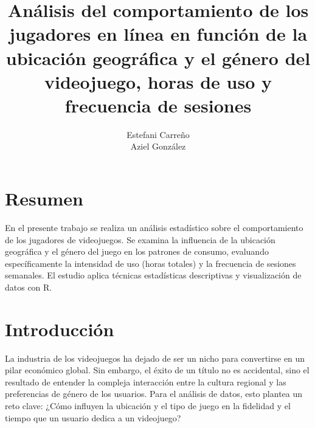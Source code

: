 \documentclass[oneside,11pt]{Latex/Classes/PhDthesisPSnPDF}
\title{Análisis del comportamiento de los jugadores en línea en función
de la ubicación geográfica y el género del videojuego, horas de uso y
frecuencia de sesiones}
\author{Estefani Carreño \\ Aziel González}
\begin{document}
\maketitle

\frontmatter


\setcounter{secnumdepth}{3}
\setcounter{tocdepth}{3}

\tableofcontents



\cleardoublepage

  \cleardoublepage       %
  \chapter*{Resumen}     %
  
  En el presente trabajo se realiza un análisis estadístico sobre el
comportamiento de los jugadores de videojuegos. Se examina la influencia
de la ubicación geográfica y el género del juego en los patrones de
consumo, evaluando específicamente la intensidad de uso (horas totales)
y la frecuencia de sesiones semanales. El estudio aplica técnicas
estadísticas descriptivas y visualización de datos con
R.             %
  
  \cleardoublepage

\mainmatter
\def\baselinestretch{1.5}

\chapter*{Introducción}

La industria de los videojuegos ha dejado de ser un nicho para
convertirse en un pilar económico global. Sin embargo, el éxito de un
título no es accidental, sino el resultado de entender la compleja
interacción entre la cultura regional y las preferencias de género de
los usuarios. Para el análisis de datos, esto plantea un reto clave:
¿Cómo influyen la ubicación y el tipo de juego en la fidelidad y el
tiempo que un usuario dedica a un videojuego?
\end{document}
